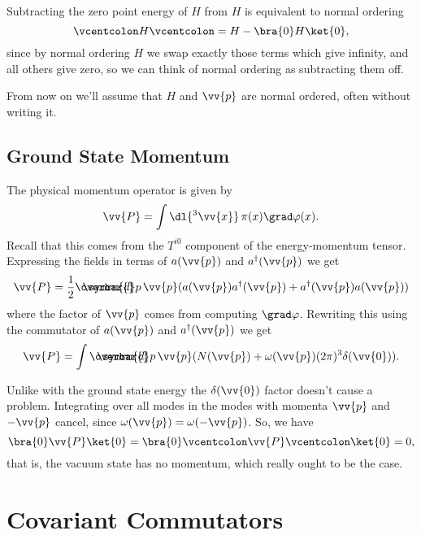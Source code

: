 \documentclass[fleqn]{NotesClass}
\newcommand{\hermit}{{\dagger}}
\newcommand{\dbar}[1][0.0]{\ThisStyle{\ensurestackMath{%
            \stackengine{#1\LMex}{\SavedStyle \symrm{d}}{\SavedStyle\overbar{}%
                \mkern2.25mu}{O}{r}{F}{F}{L}}}}
\newcommand{\invariantmeasure}[1]{%
    \mathchoice{\dbar #1}{\dbar #1}{\dbar[.05] #1}{\dbar[.06] #1}
}
\newcommand{\normalordering}[1]{\mathopen{\vcentcolon}{#1}\mathclose{\vcentcolon}}
\begin{document}
    Subtracting the zero point energy of \(H\) from \(H\) is equivalent to normal ordering
    \begin{equation}
        \normalordering{H} = H - \bra{0} H \ket{0},
    \end{equation}
    since by normal ordering \(H\) we swap exactly those terms which give infinity, and all others give zero, so we can think of normal ordering as subtracting them off.
    
    From now on we'll assume that \(H\) and \(\vv{p}\) are normal ordered, often without writing it.
    
    \section{Ground State Momentum}
    The physical momentum operator is given by
    \begin{equation}
        \vv{P} = \int \dl{^3 \vv{x}} \, \pi(x) \grad\varphi(x).
    \end{equation}
    Recall that this comes from the \(T^{i0}\) component of the energy-momentum tensor.
    Expressing the fields in terms of \(a(\vv{p})\) and \(a^\hermit(\vv{p})\) we get
    \begin{equation}
        \vv{P} = \frac{1}{2} \invariantmeasure{p} \, \vv{p} (a(\vv{p}) a^\hermit(\vv{p}) + a^\hermit(\vv{p})a(\vv{p}))
    \end{equation}
    where the factor of \(\vv{p}\) comes from computing \(\grad\varphi\).
    Rewriting this using the commutator of \(a(\vv{p})\) and \(a^\hermit(\vv{p})\) we get
    \begin{equation}
        \vv{P} = \int \invariantmeasure{p} \, \vv{p}(N(\vv{p}) + \omega(\vv{p})(2\pi)^3\delta(\vv{0})).
    \end{equation}
    
    Unlike with the ground state energy the \(\delta(\vv{0})\) factor doesn't cause a problem.
    Integrating over all modes in the modes with momenta \(\vv{p}\) and \(-\vv{p}\) cancel, since \(\omega(\vv{p}) = \omega(-\vv{p})\).
    So, we have
    \begin{equation}
        \bra{0} \vv{P} \ket{0} = \bra{0} \normalordering{\vv{P}} \ket{0} = 0,
    \end{equation}
    that is, the vacuum state has no momentum, which really ought to be the case.
    
    \chapter{Covariant Commutators}
\end{document}
